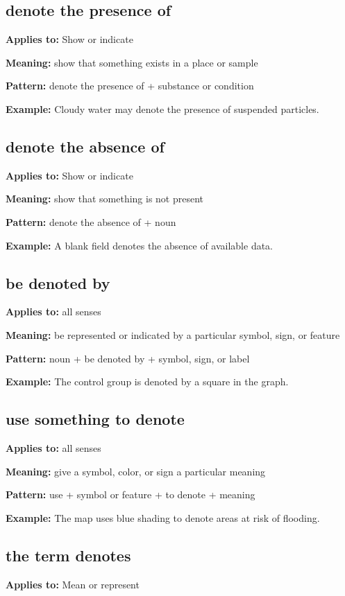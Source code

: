 \documentclass[11pt]{article}
\begin{document}
\subsection{denote the presence of}
\textbf{Applies to:} Show or indicate

\textbf{Meaning:} show that something exists in a place or sample

\textbf{Pattern:} denote the presence of + substance or condition

\textbf{Example:} Cloudy water may denote the presence of suspended particles.

\subsection{denote the absence of}
\textbf{Applies to:} Show or indicate

\textbf{Meaning:} show that something is not present

\textbf{Pattern:} denote the absence of + noun

\textbf{Example:} A blank field denotes the absence of available data.

\subsection{be denoted by}
\textbf{Applies to:} all senses

\textbf{Meaning:} be represented or indicated by a particular symbol, sign, or feature

\textbf{Pattern:} noun + be denoted by + symbol, sign, or label

\textbf{Example:} The control group is denoted by a square in the graph.

\subsection{use something to denote}
\textbf{Applies to:} all senses

\textbf{Meaning:} give a symbol, color, or sign a particular meaning

\textbf{Pattern:} use + symbol or feature + to denote + meaning

\textbf{Example:} The map uses blue shading to denote areas at risk of flooding.

\subsection{the term denotes}
\textbf{Applies to:} Mean or represent
\end{document}
